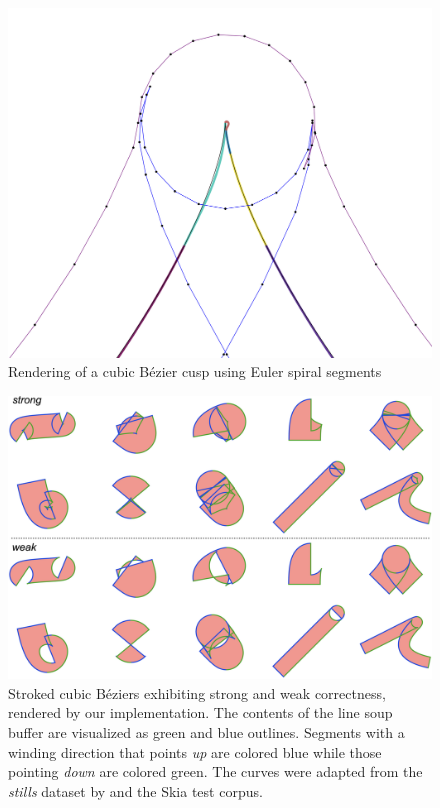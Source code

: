 \documentclass[sigconf, nonacm]{acmart}
\begin{document}
\begin{figure}
    \includegraphics[scale=0.24]{cusp_rendering}
    \caption{Rendering of a cubic Bézier cusp using Euler spiral segments}
    \label{fig:cusp_rendering}
\end{figure}

\begin{figure}
    \includegraphics[scale=0.19]{stroke_stills}
    \caption{Stroked cubic Béziers exhibiting strong and weak correctness, rendered by our implementation. The contents of the line soup buffer are visualized as green and blue outlines. Segments with a winding direction that points \emph{up} are colored blue while those pointing \emph{down} are colored green. The curves were adapted from the \emph{stills} dataset by \citet{Nehab2020} and the Skia test corpus.}
    \label{fig:stroke_stills}
\end{figure}
\end{document}
